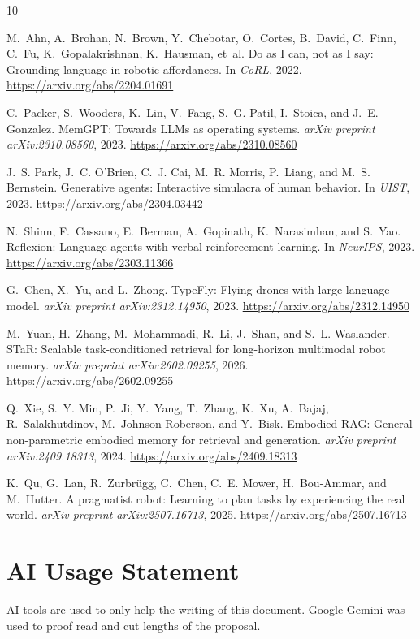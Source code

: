 \documentclass[11pt]{article}
\begin{document}
\newpage

\begin{thebibliography}{10}

M.~Ahn, A.~Brohan, N.~Brown, Y.~Chebotar, O.~Cortes, B.~David, C.~Finn, C.~Fu, K.~Gopalakrishnan, K.~Hausman, et~al.
Do as {I} can, not as {I} say: Grounding language in robotic affordances.
In \emph{CoRL}, 2022.
\url{https://arxiv.org/abs/2204.01691}

C.~Packer, S.~Wooders, K.~Lin, V.~Fang, S.~G. Patil, I.~Stoica, and J.~E. Gonzalez.
{MemGPT}: Towards {LLMs} as operating systems.
\emph{arXiv preprint arXiv:2310.08560}, 2023.
\url{https://arxiv.org/abs/2310.08560}

J.~S. Park, J.~C. O'Brien, C.~J. Cai, M.~R. Morris, P.~Liang, and M.~S. Bernstein.
Generative agents: Interactive simulacra of human behavior.
In \emph{UIST}, 2023.
\url{https://arxiv.org/abs/2304.03442}

N.~Shinn, F.~Cassano, E.~Berman, A.~Gopinath, K.~Narasimhan, and S.~Yao.
Reflexion: Language agents with verbal reinforcement learning.
In \emph{NeurIPS}, 2023.
\url{https://arxiv.org/abs/2303.11366}

G.~Chen, X.~Yu, and L.~Zhong.
{TypeFly}: Flying drones with large language model.
\emph{arXiv preprint arXiv:2312.14950}, 2023.
\url{https://arxiv.org/abs/2312.14950}

M.~Yuan, H.~Zhang, M.~Mohammadi, R.~Li, J.~Shan, and S.~L. Waslander.
{STaR}: Scalable task-conditioned retrieval for long-horizon multimodal robot memory.
\emph{arXiv preprint arXiv:2602.09255}, 2026.
\url{https://arxiv.org/abs/2602.09255}

Q.~Xie, S.~Y. Min, P.~Ji, Y.~Yang, T.~Zhang, K.~Xu, A.~Bajaj, R.~Salakhutdinov, M.~Johnson-Roberson, and Y.~Bisk.
{Embodied-RAG}: General non-parametric embodied memory for retrieval and generation.
\emph{arXiv preprint arXiv:2409.18313}, 2024.
\url{https://arxiv.org/abs/2409.18313}

K.~Qu, G.~Lan, R.~Zurbr\"{u}gg, C.~Chen, C.~E. Mower, H.~Bou-Ammar, and M.~Hutter.
A pragmatist robot: Learning to plan tasks by experiencing the real world.
\emph{arXiv preprint arXiv:2507.16713}, 2025.
\url{https://arxiv.org/abs/2507.16713}

\end{thebibliography}

\section*{AI Usage Statement}
AI tools are used to only help the writing of this document. Google Gemini was used to proof read and cut lengths of the proposal.
\end{document}
